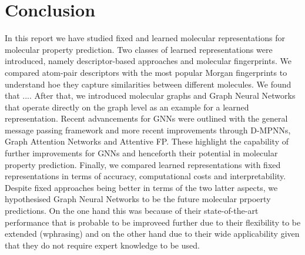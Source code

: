 \section{Conclusion}
In this report we have studied fixed and learned molecular representations for molecular property prediction. Two classes of learned representations were introduced, namely descriptor-based approaches and molecular fingerprints. We compared atom-pair descriptors with the most popular Morgan fingerprints to understand hoe they capture similarities between different molecules. We found that ....
After that, we introduced molecular graphs and Graph Neural Networks that operate directly on the graph level as an example for a learned representation. Recent advancements for GNNs were outlined with the general message passing framework and more recent improvements through D-MPNNs, Graph Attention Networks and Attentive FP. These highlight the capability of further improvements for GNNs and henceforth their potential in molecular property prediction. Finally, we compared learned representations with fixed representations in terms of accuracy, computational costs and interpretability. Despite fixed approaches being better in terms of the two latter aspects, we hypothesised Graph Neural Networks to be the future molecular prpoerty predictions. On the one hand this was because of their state-of-the-art performance that is probable to be improveed further due to their flexibility to be extended (wphrasing) and on the other hand due to their wide applicability given that they do not require expert knowledge to be used. 